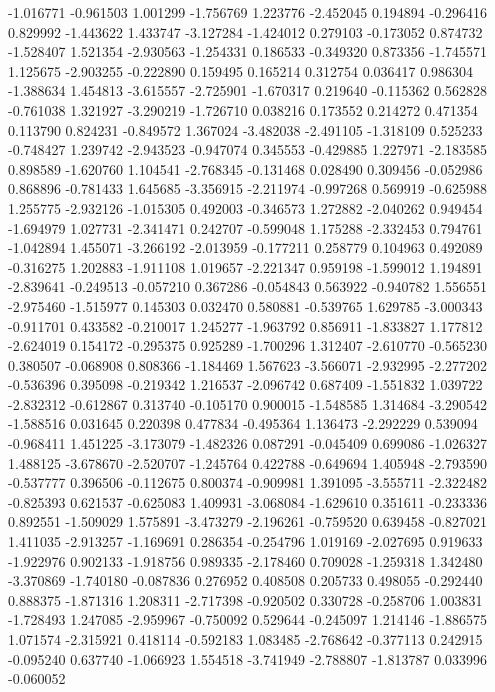 -1.016771
-0.961503
1.001299
-1.756769
1.223776
-2.452045
0.194894
-0.296416
0.829992
-1.443622
1.433747
-3.127284
-1.424012
0.279103
-0.173052
0.874732
-1.528407
1.521354
-2.930563
-1.254331
0.186533
-0.349320
0.873356
-1.745571
1.125675
-2.903255
-0.222890
0.159495
0.165214
0.312754
0.036417
0.986304
-1.388634
1.454813
-3.615557
-2.725901
-1.670317
0.219640
-0.115362
0.562828
-0.761038
1.321927
-3.290219
-1.726710
0.038216
0.173552
0.214272
0.471354
0.113790
0.824231
-0.849572
1.367024
-3.482038
-2.491105
-1.318109
0.525233
-0.748427
1.239742
-2.943523
-0.947074
0.345553
-0.429885
1.227971
-2.183585
0.898589
-1.620760
1.104541
-2.768345
-0.131468
0.028490
0.309456
-0.052986
0.868896
-0.781433
1.645685
-3.356915
-2.211974
-0.997268
0.569919
-0.625988
1.255775
-2.932126
-1.015305
0.492003
-0.346573
1.272882
-2.040262
0.949454
-1.694979
1.027731
-2.341471
0.242707
-0.599048
1.175288
-2.332453
0.794761
-1.042894
1.455071
-3.266192
-2.013959
-0.177211
0.258779
0.104963
0.492089
-0.316275
1.202883
-1.911108
1.019657
-2.221347
0.959198
-1.599012
1.194891
-2.839641
-0.249513
-0.057210
0.367286
-0.054843
0.563922
-0.940782
1.556551
-2.975460
-1.515977
0.145303
0.032470
0.580881
-0.539765
1.629785
-3.000343
-0.911701
0.433582
-0.210017
1.245277
-1.963792
0.856911
-1.833827
1.177812
-2.624019
0.154172
-0.295375
0.925289
-1.700296
1.312407
-2.610770
-0.565230
0.380507
-0.068908
0.808366
-1.184469
1.567623
-3.566071
-2.932995
-2.277202
-0.536396
0.395098
-0.219342
1.216537
-2.096742
0.687409
-1.551832
1.039722
-2.832312
-0.612867
0.313740
-0.105170
0.900015
-1.548585
1.314684
-3.290542
-1.588516
0.031645
0.220398
0.477834
-0.495364
1.136473
-2.292229
0.539094
-0.968411
1.451225
-3.173079
-1.482326
0.087291
-0.045409
0.699086
-1.026327
1.488125
-3.678670
-2.520707
-1.245764
0.422788
-0.649694
1.405948
-2.793590
-0.537777
0.396506
-0.112675
0.800374
-0.909981
1.391095
-3.555711
-2.322482
-0.825393
0.621537
-0.625083
1.409931
-3.068084
-1.629610
0.351611
-0.233336
0.892551
-1.509029
1.575891
-3.473279
-2.196261
-0.759520
0.639458
-0.827021
1.411035
-2.913257
-1.169691
0.286354
-0.254796
1.019169
-2.027695
0.919633
-1.922976
0.902133
-1.918756
0.989335
-2.178460
0.709028
-1.259318
1.342480
-3.370869
-1.740180
-0.087836
0.276952
0.408508
0.205733
0.498055
-0.292440
0.888375
-1.871316
1.208311
-2.717398
-0.920502
0.330728
-0.258706
1.003831
-1.728493
1.247085
-2.959967
-0.750092
0.529644
-0.245097
1.214146
-1.886575
1.071574
-2.315921
0.418114
-0.592183
1.083485
-2.768642
-0.377113
0.242915
-0.095240
0.637740
-1.066923
1.554518
-3.741949
-2.788807
-1.813787
0.033996
-0.060052

